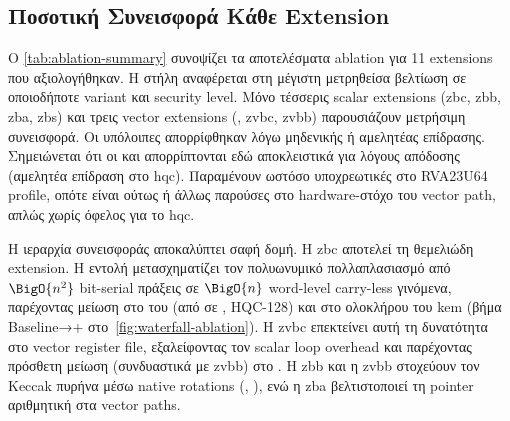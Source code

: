 \subsection{Ποσοτική Συνεισφορά Κάθε Extension}
\label{ssec:ablation-quantitative}

Ο \cref{tab:ablation-summary} συνοψίζει τα αποτελέσματα ablation για
\num{11} extensions που αξιολογήθηκαν. Η στήλη  αναφέρεται
στη μέγιστη μετρηθείσα βελτίωση σε οποιοδήποτε variant και security level.
Μόνο τέσσερις scalar extensions (\gls{zbc}, \gls{zbb}, \gls{zba}, \gls{zbs}) και
τρεις vector extensions (\RVV, \gls{zvbc}, \gls{zvbb}) παρουσιάζουν μετρήσιμη
συνεισφορά. Οι υπόλοιπες απορρίφθηκαν λόγω μηδενικής ή αμελητέας
επίδρασης. Σημειώνεται ότι οι  και  απορρίπτονται εδώ αποκλειστικά για λόγους απόδοσης (αμελητέα επίδραση στο \gls{hqc}). Παραμένουν ωστόσο υποχρεωτικές στο RVA23U64 profile, οπότε είναι ούτως ή άλλως παρούσες στο hardware-στόχο του vector path, απλώς χωρίς όφελος για το \gls{hqc}.

\begin{table}[htbp]
  \centering
  \caption{Συγκεντρωτικά αποτελέσματα ISA ablation (HQC-128, Spike ISS).
    Η στήλη  αναφέρεται στον αριθμό εντολών της extension που
    εντοπίζονται στο ELF μέσω . Η στήλη 
    αντιπροσωπεύει τη μέγιστη μετρηθείσα μείωση \instret σε οποιοδήποτε
    variant. Για \gls{zvbc}/\gls{zvbb} η μέτρηση είναι συνδυαστική (commit ),
    βλ.\ \cref{fig:waterfall-ablation}.}
  \label{tab:ablation-summary}
  \small
  
\end{table}

Η ιεραρχία συνεισφοράς αποκαλύπτει σαφή δομή. Η \gls{zbc} αποτελεί τη
θεμελιώδη extension. Η εντολή \clmul μετασχηματίζει τον πολυωνυμικό
πολλαπλασιασμό από $\BigO{n^2}$ bit-serial πράξεις σε $\BigO{n}$
word-level carry-less γινόμενα, παρέχοντας μείωση  στο \instret
του  (από  σε , HQC-128) και
 στο \instret \Decaps ολοκλήρου του \gls{kem} (βήμα Baseline→+\Zbc
στο~\cref{fig:waterfall-ablation}). Η \gls{zvbc} επεκτείνει αυτή τη δυνατότητα στο vector
register file, εξαλείφοντας τον scalar loop overhead και παρέχοντας
πρόσθετη μείωση  (συνδυαστικά με \gls{zvbb}) στο \Decaps \instret.
Η \gls{zbb} και η \gls{zvbb} στοχεύουν τον Keccak
πυρήνα μέσω native rotations (\rori, ), ενώ η \gls{zba}
βελτιστοποιεί τη pointer αριθμητική στα vector paths.

